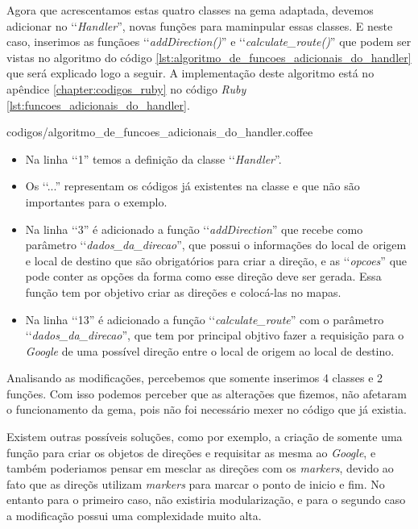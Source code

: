 Agora que acrescentamos estas quatro classes na gema adaptada, devemos adicionar no ‘‘\emph{Handler}'', 
novas funções para maminpular essas classes. E neste caso, inserimos as funçãoes ‘‘\emph{addDirection()}'' e 
‘‘\emph{calculate\_route()}'' que podem ser vistas no algoritmo do código
\ref{lst:algoritmo_de_funcoes_adicionais_do_handler} que será explicado logo a seguir. A implementação deste
algoritmo está no apêndice \ref{chapter:codigos_ruby} no código \emph{Ruby}
\ref{lst:funcoes_adicionais_do_handler}.


{codigos/algoritmo_de_funcoes_adicionais_do_handler.coffee}

\begin{itemize}

 \item Na linha ‘‘1'' temos a definição da classe ‘‘\emph{Handler}''.
 
 \item Os ‘‘...'' representam os códigos já existentes na classe e que não são importantes para o
 exemplo.

 \item Na linha ‘‘3'' é adicionado a função ‘‘\emph{addDirection}'' que recebe como parâmetro 
 ‘‘\emph{dados\_da\_direcao}'', que possui o informações do local de origem e local de destino que são 
 obrigatórios para criar a direção, e as ‘‘\emph{opcoes}'' que pode conter as opções da forma
 como esse direção deve ser gerada. Essa função tem por objetivo criar as direções e colocá-las no mapas.
 
 \item Na linha ‘‘13'' é adicionado a função ‘‘\emph{calculate\_route}'' com o parâmetro 
 ‘‘\emph{dados\_da\_direcao}'', que tem por principal objtivo fazer a requisição para o \emph{Google} de uma 
 possível direção entre o local de origem ao local de destino.
 
\end{itemize}

Analisando as modificações, percebemos que somente inserimos 4 classes e 2 funções. Com isso podemos
perceber que as alterações que fizemos, não afetaram o funcionamento da gema, pois não foi
necessário mexer no código que já existia.

Existem outras possíveis soluções, como por exemplo, a criação de somente uma função para criar os objetos
de direções e requisitar as mesma ao \emph{Google}, e também poderiamos pensar em mesclar as direções com os
\emph{markers}, devido ao fato que as direçõs utilizam \emph{markers} para marcar o ponto de inicio e fim.
No entanto para o primeiro caso, não existiria modularização, e para o segundo caso a modificação possui
uma complexidade muito alta.


